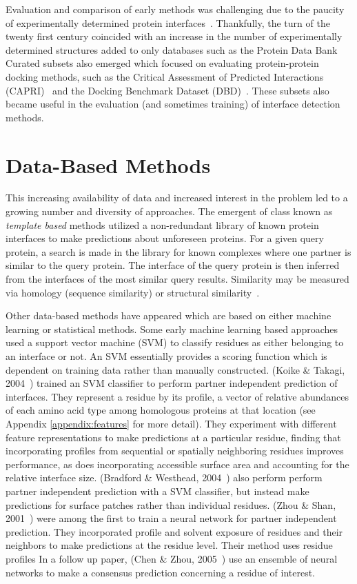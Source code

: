Evaluation and comparison of early methods was challenging due to the paucity of experimentally determined protein interfaces~\cite{esmaielbeiki2015}.
Thankfully, the turn of the twenty first century coincided with an increase in the number of experimentally determined structures added to only databases such as the Protein Data Bank~\cite{berman2000}
Curated subsets also emerged which focused on evaluating protein-protein docking methods, such as the Critical Assessment of Predicted Interactions (CAPRI)~\cite{janin2003} and the Docking Benchmark Dataset (DBD)~\cite{chen2002}.
These subsets also became useful in the evaluation (and sometimes training) of interface detection methods.

\section{Data-Based Methods}
	
This increasing availability of data and increased interest in the problem led to a growing number and diversity of approaches.
The emergent of class known as \textit{template based} methods utilized a non-redundant library of known protein interfaces to make predictions about unforeseen proteins.
For a given query protein, a search is made in the library for known complexes where one partner is similar to the query protein.
The interface of the query protein is then inferred from the interfaces of the most similar query results.
Similarity may be measured via homology (sequence similarity) or structural similarity~\cite{esmaielbeiki2015}.

Other data-based methods have appeared which are based on either machine learning or statistical methods.
Some early machine learning based approaches used a support vector machine (SVM) to classify residues as either belonging to an interface or not.
An SVM essentially provides a scoring function which is dependent on training data rather than manually constructed.
(Koike \& Takagi, 2004~\cite{koike2004}) trained an SVM classifier to perform partner independent prediction of interfaces.
They represent a residue by its profile, a vector of relative abundances of each amino acid type among homologous proteins at that location (see Appendix \ref{appendix:features} for more detail).
They experiment with different feature representations to make predictions at a particular residue, finding that incorporating profiles from sequential or spatially neighboring residues improves performance, as does incorporating accessible surface area and accounting for the relative interface size.
(Bradford \& Westhead, 2004~\cite{bradford2004}) also perform perform partner independent prediction with a SVM classifier, but instead make predictions for surface patches rather than individual residues.
(Zhou \& Shan, 2001~\cite{zhou2001}) were among the first to train a neural network for partner independent prediction.
They incorporated profile and solvent exposure of residues and their neighbors to make predictions at the residue level.
Their method uses residue profiles
In a follow up paper, (Chen \& Zhou, 2005~\cite{chen2005}) use an ensemble of neural networks to make a consensus prediction concerning a residue of interest.

